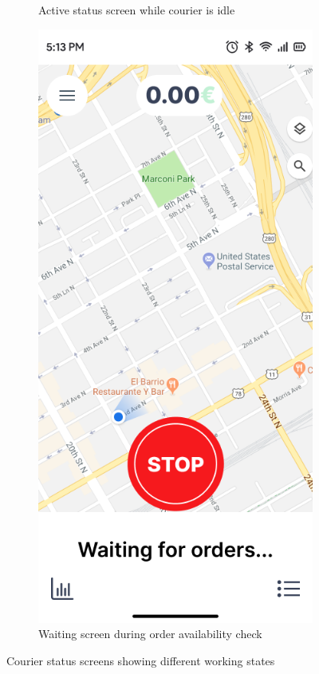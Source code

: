 \documentclass[a4paper,twoside,11pt]{article}
\begin{document}
\begin{figure}[h]
\begin{subfigure}[b]{0.48\textwidth}
        \caption{Active status screen while courier is idle}
        \label{fig:go_screen}
    \end{subfigure}
    \hfill
    \begin{subfigure}[b]{0.48\textwidth}
        \centering
        \includegraphics[width=\textwidth]{waiting_screen.png}
        \caption{Waiting screen during order availability check}
        \label{fig:waiting_screen}
    \end{subfigure}
    \caption{Courier status screens showing different working states}
    \label{fig:courier_status}
\end{figure}
\end{document}
